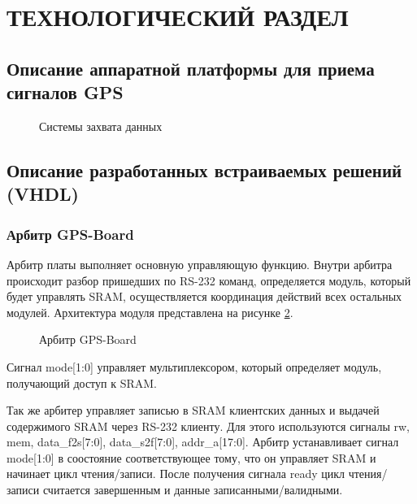 \section{ТЕХНОЛОГИЧЕСКИЙ РАЗДЕЛ}

\subsection{Описание аппаратной платформы для приема сигналов GPS}

\begin{figure}[H]
\caption{Системы захвата данных}
\label{pic:board_scheme}
\end{figure}

\subsection{Описание разработанных встраиваемых решений (VHDL)}

\subsubsection{Арбитр GPS-Board}
Арбитр платы выполняет основную управляющую функцию. Внутри арбитра происходит разбор пришедших по RS-232 команд, определяется
модуль, который будет управлять SRAM, осуществляется координация действий всех остальных модулей. Архитектура модуля представлена на
рисунке \ref{pic:arbiter_arch}.

\begin{figure}[H]
\begin{center}
\end{center}
\caption{Арбитр GPS-Board}
\label{pic:arbiter_arch}
\end{figure}

Сигнал mode[1:0] управляет мультиплексором, который определяет модуль, получающий доступ к SRAM. 

Так же арбитер управляет записью в SRAM клиентских данных и выдачей содержимого SRAM через RS-232 клиенту. Для этого используются
сигналы rw, mem, data\_f2s[7:0], data\_s2f[7:0], addr\_a[17:0]. Арбитр устанавливает сигнал mode[1:0] в соостояние соответствующее
тому, что он управляет SRAM и начинает цикл чтения/записи. После получения сигнала ready цикл чтения/записи считается завершенным
и данные записанными/валидными.

